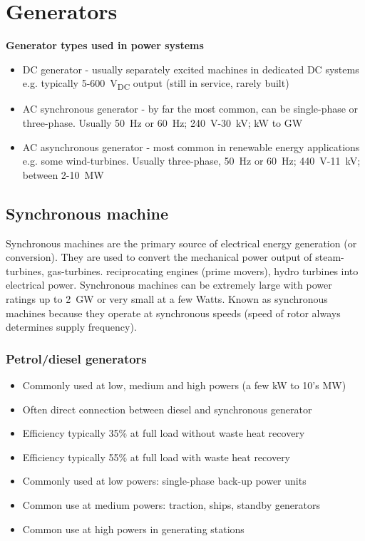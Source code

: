 \chapter{Generators}
\textbf{Generator types used in power systems}
\begin{itemize}
    \item DC generator - usually separately excited machines in dedicated DC systems e.g. typically 5-\SI{600}{V_{DC}} output (still in service, rarely built)
    \item AC synchronous generator - by far the most common, can be single-phase or three-phase. Usually \SI{50}{\hertz} or \SI{60}{\hertz}; \SI{240}{\volt}-\SI{30}{\kilo\volt}; \si{\kilo\watt} to \si{\giga\watt}
    \item AC asynchronous generator - most common in renewable energy applications e.g. some wind-turbines. Usually three-phase, \SI{50}{\hertz} or \SI{60}{\hertz}; \SI{440}{\volt}-\SI{11}{\kilo\volt}; between 2-\SI{10}{\mega\watt}
\end{itemize}
\section{Synchronous machine}
Synchronous machines are the primary source of electrical energy generation (or conversion). They are used to convert the mechanical power output of steam-turbines, gas-turbines. reciprocating engines (prime movers), hydro turbines into electrical power. Synchronous machines can be extremely large with power ratings up to \SI{2}{\giga\watt} or very small at a few Watts. Known as synchronous machines because they operate at synchronous speeds (speed of rotor always determines supply frequency).
\subsection{Petrol/diesel generators}
\begin{itemize}
    \item Commonly used at low, medium and high powers (a few \si{\kilo\watt} to 10's \si{\mega\watt})
    \item Often direct connection between diesel and synchronous generator
    \item Efficiency typically 35\% at full load without waste heat recovery
    \item Efficiency typically 55\% at full load with waste heat recovery
    \item Commonly used at low powers: single-phase back-up power units
    \item Common use at medium powers: traction, ships, standby generators
    \item Common use at high powers in generating stations
\end{itemize}
